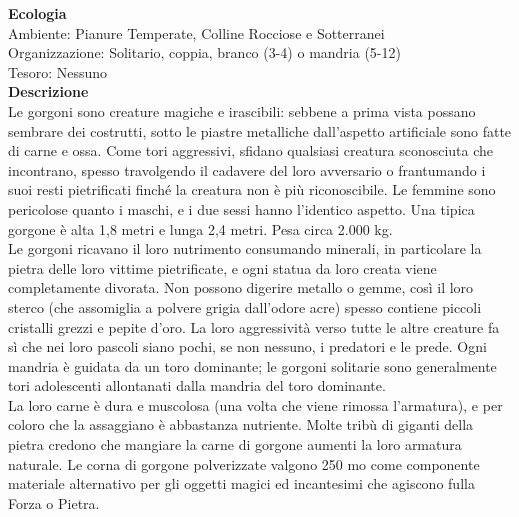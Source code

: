 \begin{multicols}{2}
\textbf{Ecologia}\\
Ambiente: Pianure Temperate, Colline Rocciose e Sotterranei\\
Organizzazione: Solitario, coppia, branco (3-4) o mandria (5-12)\\
Tesoro: Nessuno\\
\textbf{Descrizione}\\
Le gorgoni sono creature magiche e irascibili: sebbene a prima vista possano sembrare dei costrutti, sotto le piastre metalliche dall'aspetto artificiale sono fatte di carne e ossa. Come tori aggressivi, sfidano qualsiasi creatura sconosciuta che incontrano, spesso travolgendo il cadavere del loro avversario o frantumando i suoi resti pietrificati finché la creatura non è più riconoscibile. Le femmine sono pericolose quanto i maschi, e i due sessi hanno l'identico aspetto. Una tipica gorgone è alta 1,8 metri e lunga 2,4 metri. Pesa circa 2.000 kg.\\

Le gorgoni ricavano il loro nutrimento consumando minerali, in particolare la pietra delle loro vittime pietrificate, e ogni statua da loro creata viene completamente divorata. Non possono digerire metallo o gemme, così il loro sterco (che assomiglia a polvere grigia dall'odore acre) spesso contiene piccoli cristalli grezzi e pepite d’oro. La loro aggressività verso tutte le altre creature fa sì che nei loro pascoli siano pochi, se non nessuno, i predatori e le prede. Ogni mandria è guidata da un toro dominante; le gorgoni solitarie sono generalmente tori adolescenti allontanati dalla mandria del toro dominante.\\

La loro carne è dura e muscolosa (una volta che viene rimossa l'armatura), e per coloro che la assaggiano è abbastanza nutriente. Molte tribù di giganti della pietra credono che mangiare la carne di gorgone aumenti la loro armatura naturale. Le corna di gorgone polverizzate valgono 250 mo come componente materiale alternativo per gli oggetti magici ed incantesimi che agiscono fulla Forza o Pietra.\\


\end{multicols}
